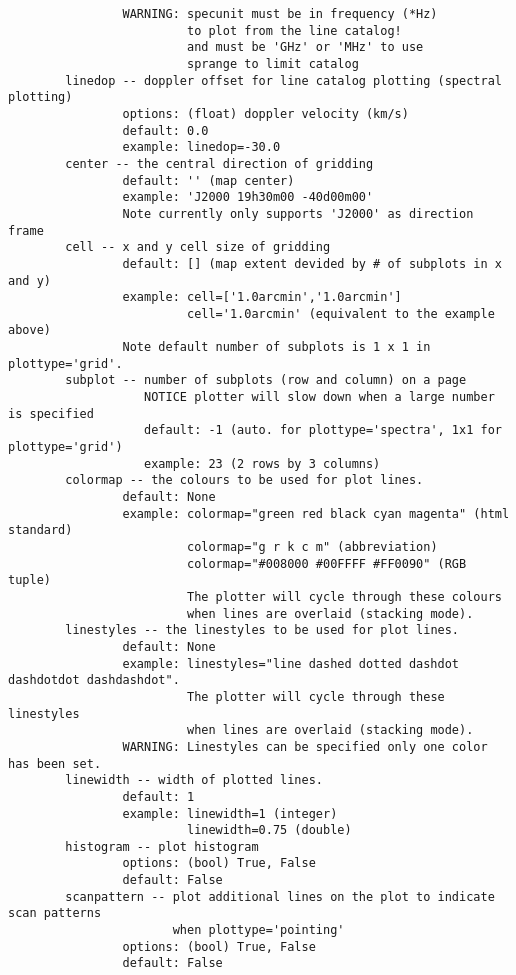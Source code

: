 \begin{verbatim}
                WARNING: specunit must be in frequency (*Hz)
                         to plot from the line catalog!
                         and must be 'GHz' or 'MHz' to use
                         sprange to limit catalog
        linedop -- doppler offset for line catalog plotting (spectral plotting)
                options: (float) doppler velocity (km/s)
                default: 0.0
                example: linedop=-30.0
        center -- the central direction of gridding
                default: '' (map center)
                example: 'J2000 19h30m00 -40d00m00'
                Note currently only supports 'J2000' as direction frame
        cell -- x and y cell size of gridding
                default: [] (map extent devided by # of subplots in x and y)
                example: cell=['1.0arcmin','1.0arcmin']
                         cell='1.0arcmin' (equivalent to the example above)
                Note default number of subplots is 1 x 1 in plottype='grid'.
        subplot -- number of subplots (row and column) on a page
                   NOTICE plotter will slow down when a large number is specified
                   default: -1 (auto. for plottype='spectra', 1x1 for plottype='grid')
                   example: 23 (2 rows by 3 columns)
        colormap -- the colours to be used for plot lines. 
                default: None
                example: colormap="green red black cyan magenta" (html standard)
                         colormap="g r k c m" (abbreviation)
                         colormap="#008000 #00FFFF #FF0090" (RGB tuple)
                         The plotter will cycle through these colours 
                         when lines are overlaid (stacking mode).
        linestyles -- the linestyles to be used for plot lines. 
                default: None
                example: linestyles="line dashed dotted dashdot dashdotdot dashdashdot". 
                         The plotter will cycle through these linestyles 
                         when lines are overlaid (stacking mode). 
                WARNING: Linestyles can be specified only one color has been set. 
        linewidth -- width of plotted lines. 
                default: 1
                example: linewidth=1 (integer)
                         linewidth=0.75 (double)
        histogram -- plot histogram
                options: (bool) True, False
                default: False
        scanpattern -- plot additional lines on the plot to indicate scan patterns
                       when plottype='pointing'
                options: (bool) True, False
                default: False

\end{verbatim}
